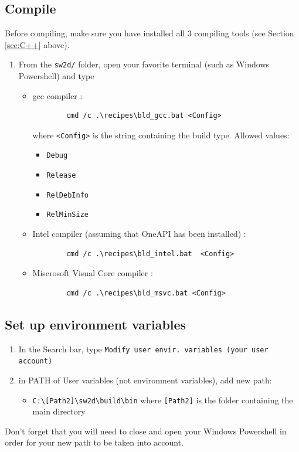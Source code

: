 \subsection{Compile}

Before compiling, make sure you have installed all 3 compiling tools (see Section \ref{sec:C++} above).
\begin{enumerate}
    \item From the \texttt{sw2d/} folder, open your favorite terminal (such as Windows Powershell) and type 
    \begin{itemize}
    	\item gcc compiler :
    	\begin{lstlisting}
    	cmd /c .\recipes\bld_gcc.bat <Config>
    	\end{lstlisting}
    	where \texttt{<Config>} is the string containing the build type. Allowed values:
    	\begin{itemize}
    	\item \texttt{Debug}
    	\item \texttt{Release}
    	\item \texttt{RelDebInfo}
    	\item \texttt{RelMinSize}
    	\end{itemize}
    	\item Intel compiler (assuming that OneAPI has been installed) :
    	\begin{lstlisting}
    	cmd /c .\recipes\bld_intel.bat  <Config>
    	\end{lstlisting}
    	\item Miscrosoft Visual Core compiler :
    	\begin{lstlisting}
    	cmd /c .\recipes\bld_msvc.bat <Config>
    	\end{lstlisting}
   	\end{itemize}
    	
    \end{enumerate}

\subsection{Set up environment variables}\label{sec:setup-env}

    \begin{enumerate}
        \item In the Search bar, type \texttt{Modify user envir. variables (your user account)}
        \item in PATH of User variables (not environment variables), add new path:
        \begin{itemize}
            \item \lstinline{C:\[Path2]\sw2d\build\bin} where \texttt{[Path2]} is the folder containing the \texttt{\swdd} main directory
        \end{itemize}
    \end{enumerate}
    Don't forget that you will need to close and open your Windows Powershell in order for your new path to be taken into account.

